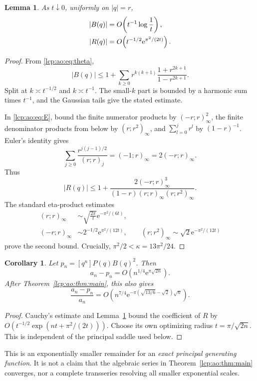 \documentclass[11pt]{article}
\numberwithin{equation}{section}
\newtheorem{lemma}[theorem]{Lemma}
\newtheorem{corollary}[theorem]{Corollary}
\theoremstyle{definition}\newtheorem{definition}[theorem]{Definition}
\theoremstyle{remark}\newtheorem{remark}[theorem]{Remark}
\newcommand{\ee}{\mathrm e}
\begin{document}
\begin{lemma}\label{lcp:ao:lem:global}
As $t\downarrow0$, uniformly on $|q|=r$,
\begin{align}\label{lcp:ao:eq:globalbounds}
 |B(q)|&=O\!\left(t^{-1}\log\frac1t\right),\notag\\
 |R(q)|&=O\!\left(t^{-1/2}\ee^{\pi^2/(2t)}\right).
\end{align}
\end{lemma}
\begin{proof}
From \eqref{lcp:ao:eq:theta},
\[
 |B(q)|\le1+\sum_{k\ge0}r^{k(k+1)}\frac{1+r^{2k+1}}{1-r^{2k+1}}.
\]
Split at $k\asymp t^{-1/2}$ and $k\asymp t^{-1}$. The small-$k$ part is bounded by a harmonic sum times $t^{-1}$, and the Gaussian tails give the stated estimate.

In \eqref{lcp:ao:eq:E}, bound the finite numerator products by $(-r;r)_\infty^2$, the finite denominator products from below by $(r;r^2)_\infty$, and $\sum_{l=0}^jr^l$ by $(1-r)^{-1}$. Euler's identity gives
\[
\sum_{j\ge0}\frac{r^{j(j-1)/2}}{(r;r)_j}=(-1;r)_\infty=2(-r;r)_\infty.
\]
Thus
\begin{equation}\label{lcp:ao:eq:explicitR}
 |R(q)|\le1+\frac{2(-r;r)_\infty^3}
 {(1-r)(r;r)_\infty(r;r^2)_\infty}.
\end{equation}
The standard eta-product estimates
\begin{align*}
(r;r)_\infty&\sim\sqrt{\frac{2\pi}{t}}\ee^{-\pi^2/(6t)},\\
(-r;r)_\infty&\sim2^{-1/2}\ee^{\pi^2/(12t)},\qquad
(r;r^2)_\infty\sim\sqrt2\ee^{-\pi^2/(12t)}
\end{align*}
prove the second bound. Crucially, $\pi^2/2<\kappa=13\pi^2/24$.
\end{proof}

\begin{corollary}\label{lcp:ao:cor:exponential}
Let $p_n=[q^n]P(q)B(q)^2$. Then
\begin{equation}\label{lcp:ao:eq:expcoefficient}
 a_n-p_n=O\!\left(n^{1/4}\ee^{\pi\sqrt{2n}}\right).
\end{equation}
After Theorem~\ref{lcp:ao:thm:main}, this also gives
\begin{equation}\label{lcp:ao:eq:exprelative}
 \frac{a_n-p_n}{a_n}
 =O\!\left(n^{7/4}\ee^{-\pi(\sqrt{13/6}-\sqrt2)\sqrt n}\right).
\end{equation}
\end{corollary}
\begin{proof}
Cauchy's estimate and Lemma~\ref{lcp:ao:lem:global} bound the coefficient of $R$ by
$O(t^{-1/2}\exp(nt+\pi^2/(2t)))$. Choose its own optimizing radius
$t=\pi/\sqrt{2n}$. This is independent of the principal saddle used below.
\end{proof}
This is an exponentially smaller remainder for an \emph{exact principal generating function}. It is not a claim that the algebraic series in Theorem~\ref{lcp:ao:thm:main} converges, nor a complete transseries resolving all smaller exponential scales.
\end{document}
